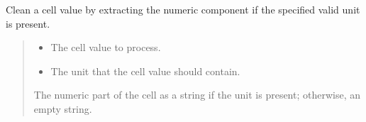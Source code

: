 \documentclass[letterpaper,10pt,english]{sphinxmanual}
\begin{document}
\begin{fulllineitems}
\label{\detokenize{autoapi/modules/output/data_clean/index:modules.output.data_clean.clean_and_strip_unit}}
\pysigstartsignatures
\pysiglinewithargsret
{}
{\sphinxparamcomma {}}
{}
\pysigstopsignatures
\sphinxAtStartPar
Clean a cell value by extracting the numeric component if the specified valid unit is present.
\begin{quote}\begin{description}
\begin{itemize}
\item {} 
\sphinxAtStartPar
{} \textendash{} The cell value to process.

\item {} 
\sphinxAtStartPar
{} \textendash{} The unit that the cell value should contain.

\end{itemize}

\sphinxAtStartPar
The numeric part of the cell as a string if the unit is present; otherwise, an empty string.

\end{description}\end{quote}

\end{fulllineitems}


\begin{fulllineitems}
\label{\detokenize{autoapi/modules/output/data_clean/index:modules.output.data_clean.renamed_columns}}
\pysigstartsignatures
\pysigline
{}
\pysigstopsignatures
\end{fulllineitems}


\begin{fulllineitems}
\label{\detokenize{autoapi/modules/output/data_clean/index:id1}}
\pysigstartsignatures
\pysigline
{}
\pysigstopsignatures
\end{fulllineitems}
\end{document}
